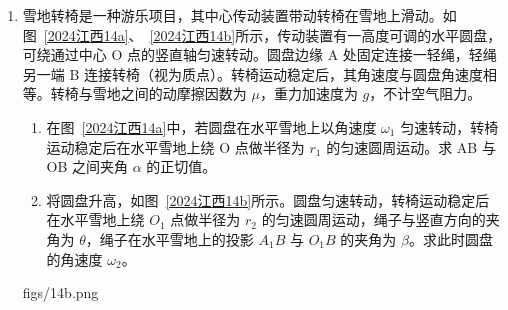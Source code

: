 \documentclass[\gkver]{gaokaozhenti}
\begin{document}
\begin{enumerate}
\item
雪地转椅是一种游乐项目，其中心传动装置带动转椅在雪地上滑动。如图~\ref{2024江西14a}、~\ref{2024江西14b}所示，传动装置有一高度可调的水平圆盘，可绕通过中心 O 点的竖直轴匀速转动。圆盘边缘 A 处固定连接一轻绳，轻绳另一端 B 连接转椅（视为质点）。转椅运动稳定后，其角速度与圆盘角速度相等。转椅与雪地之间的动摩擦因数为 $\mu$，重力加速度为 $g$，不计空气阻力。
\begin{enumerate}
	\item
	在图~\ref{2024江西14a}中，若圆盘在水平雪地上以角速度 $\omega_{1}$ 匀速转动，转椅运动稳定后在水平雪地上绕 O 点做半径为 $r_{1}$ 的匀速圆周运动。求 AB 与 OB 之间夹角 $\alpha$ 的正切值。
	\item
	将圆盘升高，如图~\ref{2024江西14b}所示。圆盘匀速转动，转椅运动稳定后在水平雪地上绕 $O_{1}$ 点做半径为 $r_{2}$ 的匀速圆周运动，绳子与竖直方向的夹角为 $\theta$，绳子在水平雪地上的投影 $A_{1}B$ 与 $O_{1}B$ 的夹角为 $\beta$。求此时圆盘的角速度 $\omega_{2}$。
\end{enumerate}
{figs/14b.png}


\end{enumerate}
\end{document}
